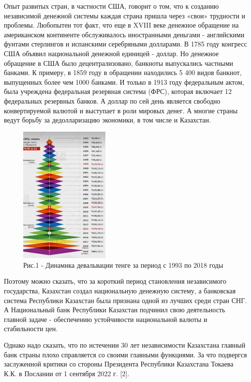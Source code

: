 \begin{multicols}{2}
Опыт развитых стран, в частности США, говорит о том, что к созданию
независимой денежной системы каждая страна пришла через «свои» трудности
и проблемы. Любопытен тот факт, что еще в XVIII веке денежное обращение
на американском континенте обслуживалось иностранными деньгами -
английскими фунтами стерлингов и испанскими серебряными долларами. В
1785 году конгресс США объявил национальной денежной единицей - доллар.
Но денежное обращение в США было децентрализовано, банкноты выпускались
частными банками. К примеру, в 1859 году в обращении находились 5 400
видов банкнот, выпущенных более чем 1000 банками. И только в 1913 году
федеральным актом, была учреждена федеральная резервная система (ФРС),
которая включает 12 федеральных резервных банков. А доллар по сей день
является свободно конвертируемой валютой и выступает в роли мировых
денег. А многие страны ведут борьбу за дедолларизацию экономики, в том
числе и Казахстан.

\begin{figure}[H]
	\centering
	\includegraphics[width=0.4\textwidth]{assets/1117}
	\caption*{Рис.1 - Динамика девальвации тенге за период с 1993 по 2018 годы}
\end{figure}

Поэтому можно сказать, что за короткий период становления независимого
государства, Казахстан создал национальную денежную систему, а
банковская система Республики Казахстан была признана одной из лучших
среди стран СНГ. А Национальный банк Республики Казахстан подчинил свою
деятельность главной задаче - обеспечению устойчивости национальной
валюты и стабильности цен.

Однако надо сказать, что по истечении 30 лет независимости Казахстана
главный банк страны плохо справляется со своими главными функциями. За
что подвергся заслуженной критики со стороны Президента Республики
Казахстана Токаева К.К. в Послании от 1 сентября 2022 г. {[}2{]}.


\end{multicols}
